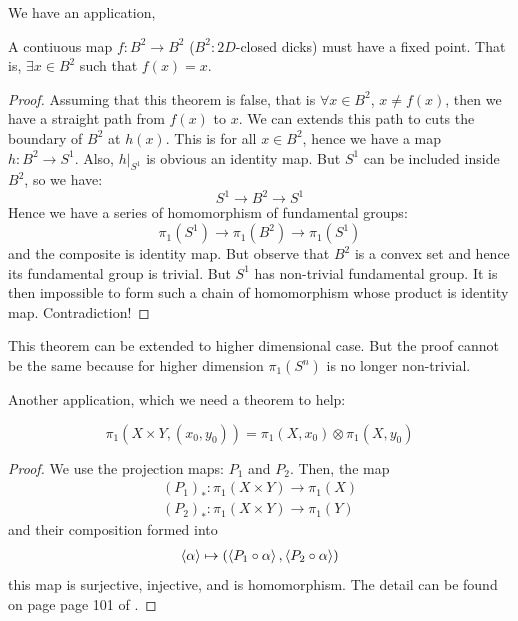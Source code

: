 We have an application,
\begin{thm}
    \label{thm:brouwer-fixpoint-B2}
    A contiuous map $f:B^2\to B^2$ ($B^2:2D$-closed dicks) must have a
fixed point. That is, $\exists x\in B^2$ such that $f(x)=x$.
\end{thm}
\begin{proof}
    Assuming that this theorem is false, that is $\forall x\in B^2$,
    $x\neq f(x)$, then we have a straight path from $f(x)$ to $x$. We can
    extends this path to cuts the boundary of $B^2$ at $h(x)$. This is
    for all $x\in B^2$, hence we have a map $h: B^2 \to S^1$. Also,
    $h|_{S^1}$ is obvious an identity map. But $S^1$ can be included
    inside $B^2$, so we have:
    \begin{equation}
        S^1 \to B^2 \to S^1
    \end{equation}
    Hence we have a series of homomorphism of fundamental groups:
    \begin{equation}
        \pi_1 (S^1) \to \pi_1 (B^2) \to \pi_1(S^1)
    \end{equation}
    and the composite is identity map. But observe that $B^2$ is a
    convex set and hence its fundamental group is trivial. But $S^1$
    has non-trivial fundamental group. It is then impossible to form
    such a chain of homomorphism whose product is identity map.
    Contradiction!
\end{proof}
\begin{remark}
    This theorem can be extended to higher dimensional case. But the
    proof cannot be the same because for higher dimension $\pi_1(S^n)$
    is no longer non-trivial.
\end{remark}

Another application, which we need a theorem to help:
\begin{thm}
    \begin{equation}
        \pi_1 (X\times Y, (x_0,y_0)) = \pi_1 (X,x_0) \otimes \pi_1
        (X,y_0)
    \end{equation}
\end{thm}
\begin{proof}
    We use the projection maps: $P_1$ and $P_2$.
    Then, the map
    \begin{align*}
        (P_1)_*: \pi_1 (X\times Y) \to \pi_1(X) \\
        (P_2)_*: \pi_1 (X\times Y) \to \pi_1(Y)
    \end{align*}
    and their composition formed into
    \begin{align*}
        \braket{\alpha}\mapsto
        (\braket{P_1\circ\alpha},\braket{P_2\circ\alpha})
    \end{align*}
    this map is surjective, injective, and is homomorphism.
    The detail can be found on page page 101 of \cite{book}.
\end{proof}

